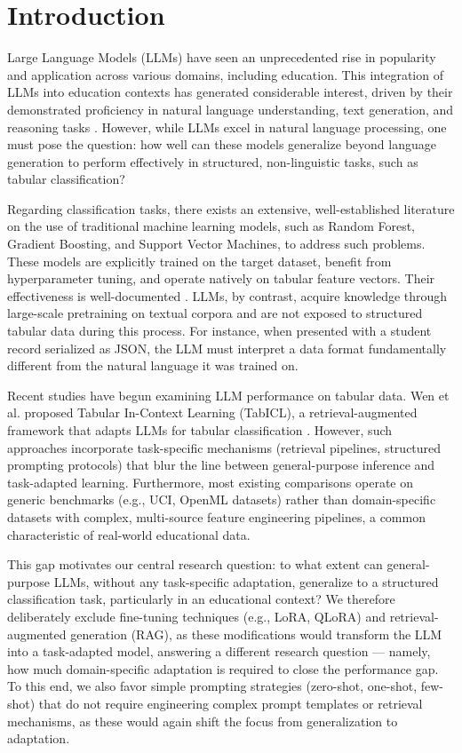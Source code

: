 \section{Introduction}
Large Language Models (LLMs) have seen an unprecedented rise in popularity and application across various domains, including education. This integration of LLMs into education contexts has generated considerable interest, driven by their demonstrated proficiency in natural language understanding, text generation, and reasoning tasks \cite{Brown2020}. However, while LLMs excel in natural language processing, one must pose the question: how well can these models generalize beyond language generation to perform effectively in structured, non-linguistic tasks, such as tabular classification? 

Regarding classification tasks, there exists an extensive, well-established literature on the use of traditional machine learning models, such as Random Forest, Gradient Boosting, and Support Vector Machines, to address such problems. These models are explicitly trained on the target dataset, benefit from hyperparameter tuning, and operate natively on tabular feature vectors. Their effectiveness is well-documented \cite{Delgado2014, Jimenez-Macias2025, Zhan2025, Bujang2021, Alhakbani2022}. LLMs, by contrast, acquire knowledge through large-scale pretraining on textual corpora and are not exposed to structured tabular data during this process. For instance, when presented with a student record serialized as JSON, the LLM must interpret a data format fundamentally different from the natural language it was trained on.

Recent studies have begun examining LLM performance on tabular data. Wen et al. proposed Tabular In-Context Learning (TabICL), a retrieval-augmented framework that adapts LLMs for tabular classification \cite{Wen2025}. However, such approaches incorporate task-specific mechanisms (retrieval pipelines, structured prompting protocols) that blur the line between general-purpose inference and task-adapted learning. Furthermore, most existing comparisons operate on generic benchmarks (e.g., UCI, OpenML datasets) rather than domain-specific datasets with complex, multi-source feature engineering pipelines, a common characteristic of real-world educational data.

This gap motivates our central research question: to what extent can general-purpose LLMs, without any task-specific adaptation, generalize to a structured classification task, particularly in an educational context? We therefore deliberately exclude fine-tuning techniques (e.g., LoRA, QLoRA) and retrieval-augmented generation (RAG), as these modifications would transform the LLM into a task-adapted model, answering a different research question — namely, how much domain-specific adaptation is required to close the performance gap. To this end, we also favor simple prompting strategies (zero-shot, one-shot, few-shot) that do not require engineering complex prompt templates or retrieval mechanisms, as these would again shift the focus from generalization to adaptation.

